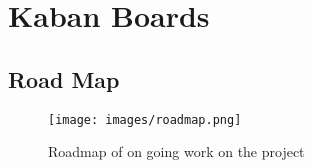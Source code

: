 \chapter{Kaban Boards}
\label{appendix:kaban-boards}
\section{Road Map}
\begin{figure}
    \centering
    \texttt{[image: images/roadmap.png]}
    \caption{Roadmap of on going work on the project}
    \label{fig:roadmap}
\end{figure}